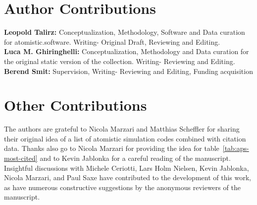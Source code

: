 \documentclass[9pt,review]{livecoms}
\newcommand{\githubrepository}{\url{https://github.com/ltalirz/livecoms-atomistic-software}}  %
\begin{document}
\section{Author Contributions}
%
\textbf{Leopold Talirz:} Conceptualization, Methodology, Software and Data curation for atomistic.software. Writing- Original Draft, Reviewing and Editing.\\
\textbf{Luca M. Ghiringhelli:} Conceptualization, Methodology and Data curation for the original static version of the collection. Writing- Reviewing and Editing.\\
\textbf{Berend Smit:} Supervision, Writing- Reviewing and Editing, Funding acquisition


\section{Other Contributions}
%
The authors are grateful to Nicola Marzari and Matthias Scheffler for sharing their original idea of a list of atomistic simulation codes combined with citation data. 
Thanks also go to Nicola Marzari for providing the idea for table~\ref{tab:aps-most-cited} and to Kevin Jablonka for a careful reading of the manuscript.
Insightful discussions with Michele Ceriotti, Lars Holm Nielsen, Kevin Jablonka, Nicola Marzari, and Paul Saxe have contributed to the development of this work, as have numerous constructive suggestions by the anonymous reviewers of the manuscript.
\end{document}
